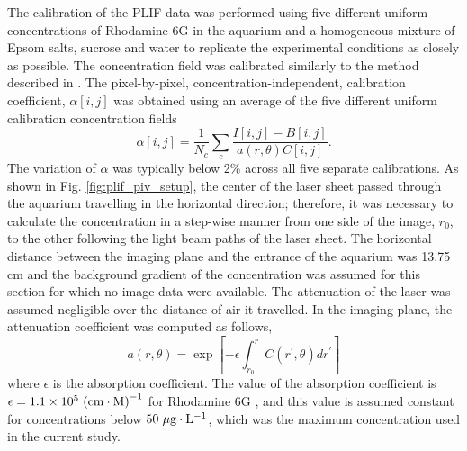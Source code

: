 \documentclass{piv13-abstract}
\newcommand{\unit}[1]{\ensuremath{\, \mathrm{\hspace{0.5mm}#1}}}
\newcommand{\figLabel}{Fig. }
\begin{document}
The calibration of the PLIF data was performed using five different uniform concentrations of Rhodamine 6G in the aquarium and a homogeneous mixture of Epsom salts, sucrose and water to replicate the experimental conditions as closely as possible. The concentration field was calibrated similarly to the method described in \cite{Crimaldi2008}. The pixel-by-pixel, concentration-independent, calibration coefficient, $\alpha\left[i,j\right]$ was obtained using an average of the five different uniform calibration concentration fields
%
\begin{equation}
\alpha\left[i,j\right] = \frac{1}{N_c}\sum_{c}\frac{I\left[i,j\right] - B\left[i,j\right]}{a\left(r,\theta\right)C\left[i,j\right]}.
\end{equation} 
%
The variation of $\alpha$ was typically below 2\% across all five separate calibrations. As shown in \figLabel\ref{fig:plif_piv_setup}, the center of the laser sheet passed through the aquarium travelling in the horizontal direction; therefore, it was necessary to calculate the concentration in a step-wise manner from one side of the image, $r_0$, to the other following the light beam paths of the laser sheet. The horizontal distance between the imaging plane and the entrance of the aquarium was 13.75 cm and the background gradient of the concentration was assumed for this section for which no image data were available. The attenuation of the laser was assumed negligible over the distance of air it travelled. In the imaging plane, the attenuation coefficient was computed as follows,
\begin{equation}
a(r,\theta) = \exp\left[-\epsilon\int_{r_0}^r C\left(r^{\prime},\theta\right)dr^{\prime}\right]
\end{equation}
%
where $\epsilon$ is the absorption coefficient.  The value of the absorption coefficient is $\epsilon = 1.1\times10^5\unit{\left(cm\cdot M\right)^{-1}}$ for Rhodamine 6G \cite{Ferrier1993}, and this value is assumed constant for concentrations below $50\unit{\mu g\cdot L^{-1}}$, which was the maximum concentration used in the current study.
\end{document}
